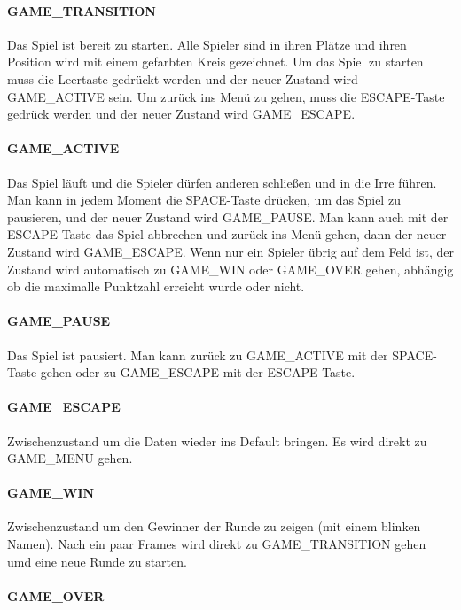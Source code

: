\documentclass[doktyp=studarbeit]{TUBAFarbeiten}
\begin{document}
\paragraph{GAME\_TRANSITION}
Das Spiel ist bereit zu starten. Alle Spieler sind in ihren Plätze und ihren
Position wird mit einem gefarbten Kreis gezeichnet. Um das Spiel zu starten
muss die Leertaste gedrückt werden und der neuer Zustand wird GAME\_ACTIVE sein.
Um zurück ins Menü zu gehen, muss die ESCAPE-Taste gedrück werden und der neuer
Zustand wird GAME\_ESCAPE.
\paragraph{GAME\_ACTIVE}
Das Spiel läuft und die Spieler dürfen anderen schließen und in die Irre führen.
Man kann in jedem Moment die SPACE-Taste drücken, um das Spiel zu pausieren,
und der neuer Zustand wird GAME\_PAUSE. Man kann auch mit der ESCAPE-Taste das
Spiel abbrechen und zurück ins Menü gehen, dann der neuer Zustand wird 
GAME\_ESCAPE. Wenn nur ein Spieler übrig auf dem Feld ist, der Zustand wird 
automatisch zu GAME\_WIN oder GAME\_OVER gehen, abhängig ob die maximalle 
Punktzahl erreicht wurde oder nicht.
\paragraph{GAME\_PAUSE}
Das Spiel ist pausiert. Man kann zurück zu GAME\_ACTIVE mit der SPACE-Taste
gehen oder zu GAME\_ESCAPE mit der ESCAPE-Taste.
\paragraph{GAME\_ESCAPE}
Zwischenzustand um die Daten wieder ins Default bringen. Es wird direkt zu 
GAME\_MENU gehen.
\paragraph{GAME\_WIN}
Zwischenzustand um den Gewinner der Runde zu zeigen (mit einem blinken Namen).
Nach ein paar Frames wird direkt zu GAME\_TRANSITION gehen umd eine neue Runde
zu starten. 
\paragraph{GAME\_OVER}

\printbibliography[heading=bibintoc]
\end{document}
